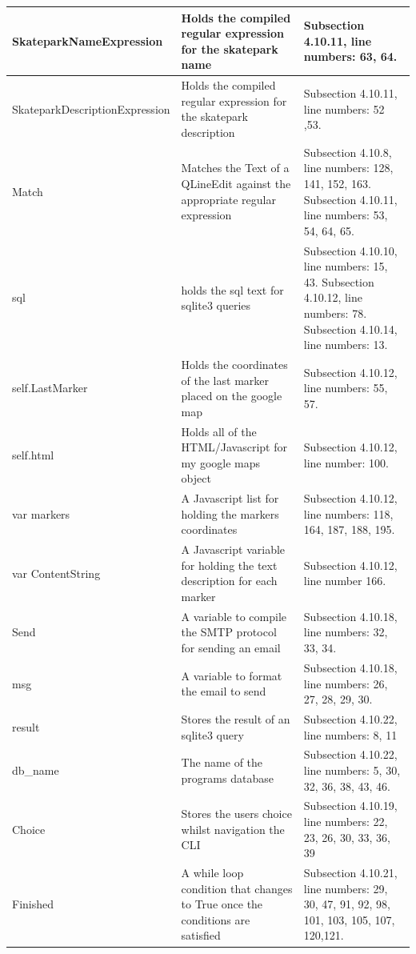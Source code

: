 \begin{center}
\begin{longtable}{|p{5cm}|p{6cm}|p{3.5cm}|}
SkateparkNameExpression & Holds the compiled regular expression for the skatepark name& Subsection 4.10.11, line numbers: 63, 64. \\ \hline
SkateparkDescriptionExpression & Holds the compiled regular expression for the skatepark description & Subsection 4.10.11, line numbers: 52 ,53. \\ \hline
Match & Matches the Text of a QLineEdit against the appropriate regular expression & Subsection 4.10.8, line numbers: 128, 141, 152, 163. Subsection 4.10.11, line numbers: 53, 54, 64, 65. \\ \hline
sql & holds the sql text for sqlite3 queries & Subsection 4.10.10, line numbers: 15, 43. Subsection 4.10.12, line numbers: 78. Subsection 4.10.14, line numbers: 13. \\ \hline
self.LastMarker & Holds the coordinates of the last marker placed on the google map & Subsection 4.10.12, line numbers: 55, 57. \\ \hline
self.html & Holds all of the HTML/Javascript for my google maps object & Subsection 4.10.12, line number: 100. \\ \hline
var markers & A Javascript list for holding the markers coordinates & Subsection 4.10.12, line numbers: 118, 164, 187, 188, 195. \\ \hline
var ContentString & A Javascript variable for holding the text description for each marker & Subsection 4.10.12, line number 166. \\ \hline
Send & A variable to compile the SMTP protocol for sending an email & Subsection 4.10.18, line numbers: 32, 33, 34.  \\ \hline
msg & A variable to format the email to send & Subsection 4.10.18, line numbers: 26, 27, 28, 29, 30. \\ \hline
result & Stores the result of an sqlite3 query & Subsection 4.10.22, line numbers: 8, 11 \\ \hline
db\_name & The name of the programs database & Subsection 4.10.22, line numbers: 5, 30, 32, 36, 38, 43, 46.\\ \hline 
Choice & Stores the users choice whilst navigation the CLI & Subsection 4.10.19, line numbers: 22, 23, 26, 30, 33, 36, 39\\ \hline 
Finished & A while loop condition that changes to True once the conditions are satisfied & Subsection 4.10.21, line numbers: 29, 30, 47, 91, 92, 98, 101, 103, 105, 107, 120,121. \\ \hline



\end{longtable}
\label{tab:Variable List}
\end{center}






